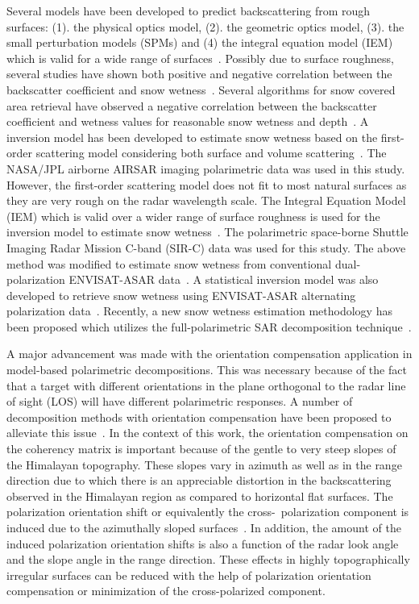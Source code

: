 Several models have been developed to predict backscattering from rough surfaces: (1). the physical optics model, (2). the geometric optics model, (3). the small perturbation models (SPMs) and (4) the integral equation model (IEM) which is valid for a wide range of surfaces~\citep{Fung92,fung1994microwave}. Possibly due to surface roughness, several studies have shown both positive and negative correlation between the backscatter coefficient and snow wetness~\citep{stiles1980dielectric,shi1992radar}. Several algorithms for snow covered area retrieval have observed a negative correlation between the backscatter coefficient and wetness values for reasonable snow wetness and depth~\citep{Koskinen97,Nagler2000,Guneriussen2001b}. A inversion model has been developed to estimate snow wetness based on the first-order scattering model considering both surface and volume scattering~\citep{Shi93}. The NASA/JPL airborne AIRSAR imaging polarimetric data was used in this study. However, the first-order scattering model does not fit to most natural surfaces as they are very rough on the radar wavelength scale. The Integral Equation Model (IEM) which is valid over a wider range of surface roughness is used for the inversion model to estimate snow wetness~\citep{Shi95wetness}. The polarimetric space-borne Shuttle Imaging Radar Mission C-band (SIR-C) data was used for this study. The above method was modified to estimate snow wetness from conventional dual-polarization ENVISAT-ASAR data~\citep{singh2010snow}. A statistical inversion model was also developed to retrieve snow wetness using ENVISAT-ASAR alternating polarization data~\citep{niang2007new}. Recently, a new snow wetness estimation methodology has been proposed which utilizes the full-polarimetric SAR decomposition technique~\citep{Surendar13a}. 

A major advancement was made with the orientation compensation application in model-based polarimetric decompositions. This was necessary because of the fact that a target with different orientations in the plane orthogonal to the radar line of sight (LOS) will have different polarimetric responses. A number of decomposition methods with orientation compensation have been proposed to alleviate this issue~\citep{Lee2011,An10,YAMAGUCHI2011,singh13,arii2011adaptive,Chen14}. In the context of this work, the orientation compensation on the coherency matrix is important because of the gentle to very steep slopes of the Himalayan topography. These slopes vary in azimuth as well as in the range direction due to which there is an appreciable distortion in the backscattering observed in the Himalayan region as compared to horizontal flat surfaces. The polarization orientation shift or equivalently the cross-~polarization component is induced due to the azimuthally sloped surfaces~\citep{Lee2000,Lee2002}. In addition, the amount of the induced polarization orientation shifts is also a function of the radar look angle and the slope angle in the range direction. These effects in highly topographically irregular surfaces can be reduced with the help of polarization orientation compensation or minimization of the cross-polarized component. 

